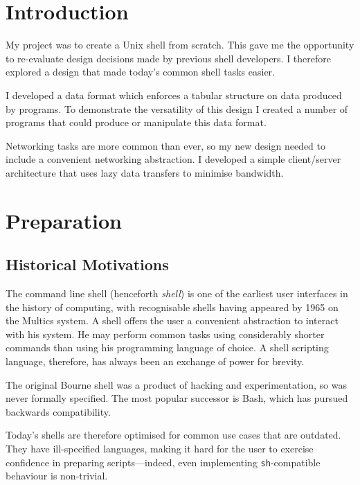 \documentclass[12pt,twoside,notitlepage]{report}
\begin{document}
\cleardoublepage        %

\setcounter{page}{1}
\pagestyle{headings}

\chapter{Introduction}
My project was to create a Unix shell from scratch. This gave me the opportunity
to re-evaluate design decisions made by previous shell developers. I therefore
explored a design that made today's common shell tasks easier.

I developed a data format which enforces a tabular structure on data produced by
programs. To demonstrate the versatility of this design I created a number of
programs that could produce or manipulate this data format.

Networking tasks are more common than ever, so my new design needed to include a
convenient networking abstraction. I developed a simple client/server
architecture that uses lazy data transfers to minimise bandwidth.



\cleardoublepage

\chapter{Preparation}

\section{Historical Motivations}
The command line shell (henceforth \emph{shell}) is one of the earliest user
interfaces in the history of computing, with recognisable shells having appeared
by 1965 \cite{multics} on the Multics system. A shell offers the user a
convenient abstraction to interact with his system. He may perform common tasks
using considerably shorter commands than using his programming language of
choice. A shell scripting language, therefore, has always been an exchange of
power for brevity.

The original Bourne shell was a product of hacking and experimentation, so was
never formally specified. The most popular successor is Bash, which has pursued
backwards compatibility.

Today's shells are therefore optimised for common use cases that are
outdated. They have ill-specified languages, making it hard for the user to
exercise confidence in preparing scripts---indeed, even implementing
\texttt{sh}-compatible behaviour is non-trivial\cite{bourne}.
\end{document}
